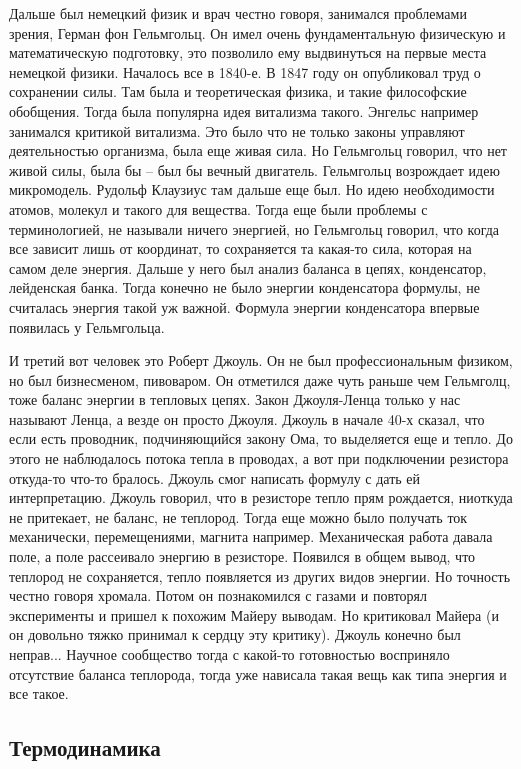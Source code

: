 \documentclass[a4paper, 12pt]{article}
\begin{document}
Дальше был немецкий физик и врач честно говоря, занимался проблемами 
зрения, Герман фон Гельмгольц. Он имел очень фундаментальную физическую 
и математическую подготовку, это позволило ему выдвинуться на первые 
места немецкой физики. Началось все в 1840-е. В 1847 году он опубликовал 
труд о сохранении силы. Там была и теоретическая физика, и такие 
философские обобщения. Тогда была популярна идея витализма такого. 
Энгельс например занимался критикой витализма. Это было что не только 
законы управляют деятельностью организма, была еще живая сила. Но 
Гельмгольц говорил, что нет живой силы, была бы -- был бы вечный 
двигатель. Гельмгольц возрождает идею микромодель. Рудольф Клаузиус там 
дальше еще был. Но идею необходимости атомов, молекул и такого для 
вещества. Тогда еще были проблемы с терминологией, не называли ничего 
энергией, но Гельмгольц говорил, что когда все зависит лишь от 
координат, то сохраняется та какая-то сила, которая на самом деле 
энергия. Дальше у него был анализ баланса в цепях, конденсатор, 
лейденская банка. Тогда конечно не было энергии конденсатора формулы, не 
считалась энергия такой уж важной. Формула энергии конденсатора впервые 
появилась у Гельмгольца.

И третий вот человек это Роберт Джоуль. Он не был профессиональным 
физиком, но был бизнесменом, пивоваром. Он отметился даже чуть раньше 
чем Гельмголц, тоже баланс энергии в тепловых цепях. Закон Джоуля-Ленца 
только у нас называют Ленца, а везде он просто Джоуля. Джоуль в начале 
40-х сказал, что если есть проводник, подчиняющийся закону Ома, то 
выделяется еще и тепло. До этого не наблюдалось потока тепла в проводах, 
а вот при подключении резистора откуда-то что-то бралось. Джоуль смог 
написать формулу с дать ей интерпретацию. Джоуль говорил, что 
в резисторе тепло прям рождается, ниоткуда не притекает, не баланс, не 
теплород. Тогда еще можно было получать ток механически, перемещениями, 
магнита например. Механическая работа давала поле, а поле рассеивало 
энергию в резисторе. Появился в общем вывод, что теплород не 
сохраняется, тепло появляется из других видов энергии. Но точность 
честно говоря хромала. Потом он познакомился с газами и повторял 
эксперименты и пришел к похожим Майеру выводам. Но критиковал Майера (и 
он довольно тяжко принимал к сердцу эту критику). Джоуль конечно был 
неправ... Научное сообщество тогда с какой-то готовностью восприняло 
отсутствие баланса теплорода, тогда уже нависала такая вещь как типа 
энергия и все такое.

\subsection{Термодинамика}
\end{document}
